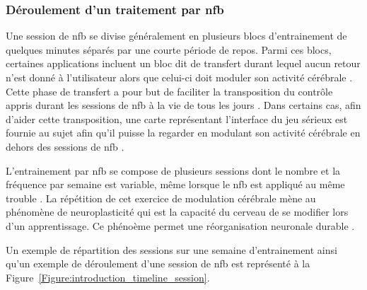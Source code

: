 \subsubsection{Déroulement d'un traitement par \gls{nfb}}

Une session de \gls{nfb} se divise généralement en plusieurs blocs d'entrainement de quelques minutes séparés par une courte période de repos.
Parmi ces blocs, certaines applications incluent 
un bloc dit de transfert durant lequel aucun retour n'est donné à l'utilisateur alors que celui-ci doit moduler son activité cérébrale \citep{Bioulac2019,
Bluschke2016, Gani2008, Strehl2006}. Cette phase de transfert a pour but de faciliter la transposition du contrôle appris durant les 
sessions de \gls{nfb} à la vie de tous les jours \citep{Arns2014}. Dans certains cas, afin d'aider cette transposition, une carte représentant l'interface du jeu sérieux est 
fournie au sujet afin qu'il puisse la regarder en modulant son activité cérébrale en dehors des sessions de \gls{nfb} \citep{Leins2007}.

L'entrainement par \gls{nfb} se compose de plusieurs sessions dont le nombre et la fréquence par semaine est variable, même lorsque le \gls{nfb} est appliqué au même trouble 
\citep{Enriquez2017}. La répétition de cet exercice de modulation cérébrale mène au phénomène de 
neuroplasticité \citep{VanDoren2017, Ros2010} qui est la capacité du cerveau de se modifier lors d'un apprentissage. Ce phénoème 
permet une réorganisation neuronale durable \citep{VanDoren2017}. 

Un exemple de répartition des sessions sur une semaine d'entrainement ainsi qu'un exemple de déroulement d'une session de \gls{nfb} est représenté à la
Figure~\ref{Figure:introduction_timeline_session}. 

